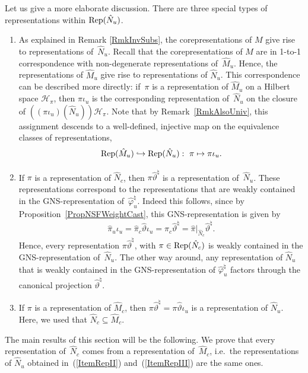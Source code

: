 \documentclass[11pt]{article}
\numberwithin{equation}{section}
\theoremstyle{definition}
\newcommand{\Rep}{\text{\rm Rep}}
\newcommand{\cHil}{\mathcal{H}}
\begin{document}
Let us give a more elaborate discussion. There are three special types of representations within $\Rep(\hat{N}_u)$.
\begin{enumerate}\itemsep=0pt
\item\label{ItemRepI} As explained in Remark \ref{RmkInvSubs}, the corepresentations of $M$ give rise to representations of~$\hat{N}_u$. Recall \cite{Kus} that the corepresentations of $M$ are in 1-to-1 correspondence with non-degenerate representations of~$\hat{M}_u$. Hence, the representations of $\hat{M}_u$ give rise to representations of $\hat{N}_u$. This correspondence can be described more directly: if~$\pi$ is a representation of $\hat{M}_u$ on a Hilbert space $\cHil_\pi$, then $\pi\iota_u$ is the corresponding representation of~$\hat{N}_u$ on the closure of $((\pi\iota_u)(\hat{N}_u)) \cHil_\pi$.  Note that by Remark~\ref{RmkAlsoUniv}, this assignment  descends to a well-def\/ined, injective map on the equivalence classes of representations,
\[
\Rep(\hat{M}_u) \hookrightarrow \Rep(\hat{N}_u): \ \pi \mapsto \pi \iota_u.
\]
\item\label{ItemRepII} If $\pi$ is a representation of $\hat{N}_c$, then $\pi \hat{\vartheta}^\natural$ is a representation of~$\hat{N}_u$. These representations correspond to the representations that are weakly contained in the GNS-representation of~$\hat{\varphi}^\natural_u$. Indeed this follows, since by Proposition~\ref{PropNSFWeightCast}, this GNS-representation is given by
\[
\hat{\pi}_u \iota_u = \hat{\pi}_c \hat{\vartheta} \iota_u = \hat{\pi}_c \hat{\vartheta}^\natural = \hat{\pi}\vert_{\hat{N}_c} \hat{\vartheta}^\natural.
\]
Hence, every representation   $\pi \hat{\vartheta}^\natural$, with $\pi \in \Rep(\hat{N}_c)$ is weakly contained in the GNS-representation of~$\hat{N}_u$. The other way around, any representation of $\hat{N}_u$ that is weakly contained in the GNS-representation of $\hat{\varphi}^\natural_u$ factors through the canonical projection $\hat{\vartheta}^\natural$.
\item\label{ItemRepIII} If $\pi$ is a representation of $\hat{M}_c$, then $\pi \hat{\vartheta}^\natural = \pi \hat{\vartheta} \iota_u$ is a representation of $\hat{N}_u$.  Here, we  used that $\hat{N}_c \subseteq \hat{M}_c$.
\end{enumerate}

The main results of this section will be the following. We prove that every representation of~$\hat{N}_c$ comes from a representation of~$\hat{M}_c$, i.e.\ the representations of $\hat{N}_u$ obtained in~(\ref{ItemRepII}) and~(\ref{ItemRepIII}) are the same ones.
\end{document}
